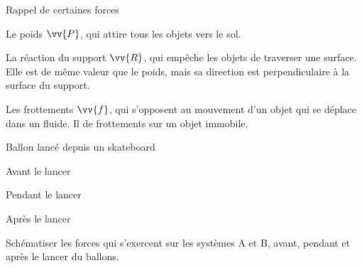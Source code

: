 \begin{doc}{Rappel de certaines forces}
  \begin{listePoints}
    \item Le poids $\vv{P}$, qui attire tous les objets vers le sol.
    \item La réaction du support $\vv{R}$, qui empêche les objets de traverser une surface.
    Elle est de même valeur que le poids, mais sa direction est perpendiculaire à la surface du support.
    \item Les frottements $\vv{f}$, qui s'opposent au mouvement d'un objet qui se déplace dans un fluide.
    Il  de frottements sur un objet immobile.
  \end{listePoints}
\end{doc}


\begin{doc}{Ballon lancé depuis un skateboard}
  \vspace*{-18pt}
  \begin{flushright}  
  \end{flushright}
  
  \begin{multicols}{3}
    \centering
    
    Avant le lancer
    

    Pendant le lancer
    

    Après le lancer
  \end{multicols}
\end{doc}





\schematisation Schématiser les forces qui s'exercent sur les systèmes A et B, avant, pendant et après le lancer du ballons. 